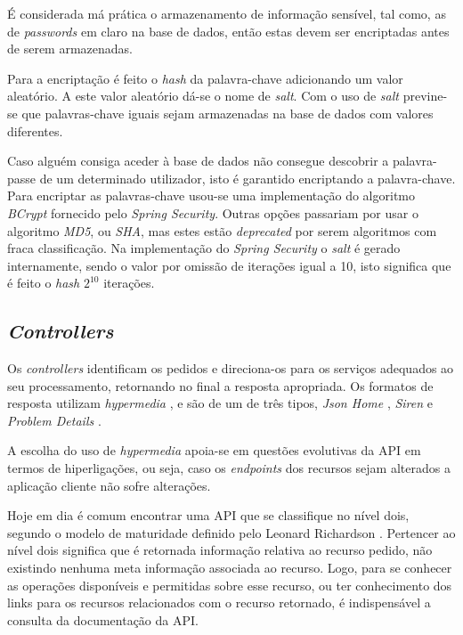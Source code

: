 É considerada má prática o armazenamento de informação sensível, tal como, as de \textit{passwords} em claro na base de dados, então estas devem ser encriptadas antes de serem armazenadas.

Para a encriptação é feito o \textit{hash} da palavra-chave adicionando um valor aleatório. A este valor aleatório dá-se o nome de \textit{salt}. Com o uso de \textit{salt} previne-se que palavras-chave iguais sejam armazenadas na base de dados com valores diferentes. 

Caso alguém consiga aceder à base de dados não consegue descobrir a palavra-passe de um determinado utilizador, isto é garantido encriptando a palavra-chave. Para encriptar as palavras-chave usou-se uma implementação do algoritmo \textit{BCrypt} \cite{BCrypt:spring-security} fornecido pelo \textit{Spring Security}. Outras opções passariam por usar o algoritmo \textit{MD5}, ou \textit{SHA}, mas estes estão \textit{deprecated} por serem algoritmos com fraca classificação. Na implementação do \textit{Spring Security} o \textit{salt} é gerado internamente, sendo o valor por omissão de iterações igual a 10, isto significa que é feito o \textit{hash} $2^{10}$ iterações.


%
%
\subsection{\textit{Controllers}}\label{subsec333}

Os \textit{controllers} identificam os pedidos e direciona-os para os serviços adequados ao seu processamento, retornando no final a resposta apropriada. Os formatos de resposta utilizam \textit{hypermedia} \cite{APIBestP87:hypermedia}, e são de um de três tipos, \textit{Json Home} \cite{draftnot72:jsonHome}, \textit{Siren} \cite{kevinswiber:siren} e \textit{Problem Details} \cite{RFC7807:problemDetails}. 

A escolha do uso de \textit{hypermedia} apoia-se em questões evolutivas da API em termos de hiperligações, ou seja, caso os \textit{endpoints} dos recursos sejam alterados a aplicação cliente não sofre alterações.

Hoje em dia é comum encontrar uma API que se classifique no nível dois, segundo o modelo de maturidade definido pelo Leonard Richardson \cite{RichardsonMaturityModel:martinFowler}. Pertencer ao nível dois significa que é retornada informação relativa ao recurso pedido, não existindo nenhuma meta informação associada ao recurso. Logo, para se conhecer as operações disponíveis e permitidas sobre esse recurso, ou ter conhecimento dos links para os recursos relacionados com o recurso retornado, é indispensável a consulta da documentação da API. 

